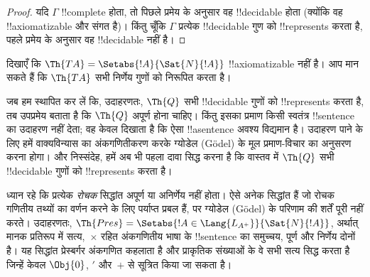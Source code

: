 \documentclass[../../../include/open-logic-section]{subfiles}
\begin{document}
\begin{proof}
यदि $\Gamma$ !!{complete} होता, तो पिछले प्रमेय के अनुसार वह !!{decidable}
होता (क्योंकि वह !!{axiomatizable} और संगत है)। किंतु चूँकि $\Gamma$ प्रत्येक
!!{decidable} गुण को !!{represents} करता है, पहले प्रमेय के अनुसार वह
!!{decidable} नहीं है।
\end{proof}

\begin{prob}
दिखाएँ कि $\Th{TA} = \Setabs{!A}{\Sat{N}{!A}}$ !!{axiomatizable} नहीं है।
आप मान सकते हैं कि $\Th{TA}$ सभी निर्णेय गुणों को निरूपित करता है।
\end{prob}

जब हम स्थापित कर लें कि, उदाहरणतः, $\Th{Q}$ सभी !!{decidable} गुणों को
!!{represents} करता है, तब उपप्रमेय बताता है कि $\Th{Q}$ अपूर्ण होना चाहिए।
किंतु इसका प्रमाण किसी स्वतंत्र !!{sentence} का उदाहरण नहीं देता; वह केवल
दिखाता है कि ऐसा !!a{sentence} अवश्य विद्यमान है। उदाहरण पाने के लिए हमें
वाक्यविन्यास का अंकगणितीकरण करके ग्योडेल (G\"odel) के मूल प्रमाण-विचार का
अनुसरण करना होगा। और निस्संदेह, हमें अब भी पहला दावा सिद्ध करना है कि वास्तव
में $\Th{Q}$ सभी !!{decidable} गुणों को !!{represents} करता है।

ध्यान रहे कि प्रत्येक \emph{रोचक} सिद्धांत अपूर्ण या अनिर्णेय नहीं होता। ऐसे
अनेक सिद्धांत हैं जो रोचक गणितीय तथ्यों का वर्णन करने के लिए पर्याप्त प्रबल
हैं, पर ग्योडेल (G\"odel) के परिणाम की शर्तें पूरी नहीं करते। उदाहरणतः,
$\Th{Pres} = \Setabs{!A \in \Lang{L_{A^+}}}{\Sat{N}{!A}}$, अर्थात् मानक
प्रतिरूप में सत्य,~$\times$ रहित अंकगणितीय भाषा के !!{sentence} का समुच्चय,
पूर्ण और निर्णेय दोनों है। यह सिद्धांत प्रेस्बर्गर अंकगणित कहलाता है और
प्राकृतिक संख्याओं के वे सभी सत्य सिद्ध करता है जिन्हें केवल $\Obj{0}$,
$\prime$ और~$+$ से सूत्रित किया जा सकता है।
\end{document}
